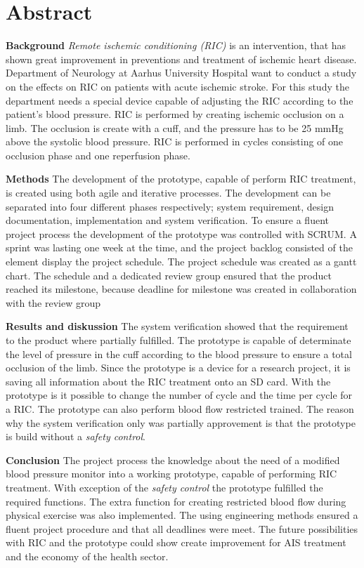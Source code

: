 \chapter*{Abstract}
\textbf{Background} \textit{Remote ischemic conditioning (RIC)} is an intervention, that has shown great improvement in preventions and treatment of ischemic heart disease. Department of Neurology at Aarhus University Hospital want to conduct a study on the effects on RIC on patients with acute ischemic stroke. For this study the department needs a special device capable of adjusting the RIC according to the patient's blood pressure. RIC is performed by creating ischemic occlusion on a limb. The occlusion is create with a cuff, and the pressure has to be 25 mmHg above the systolic blood pressure. RIC is performed in cycles consisting of one occlusion phase and one reperfusion phase. 

\textbf{Methods} The development of the prototype, capable of perform RIC treatment, is created using both agile and iterative processes. The development can be separated into four different phases respectively; system requirement, design documentation, implementation and system verification. To ensure a fluent project process the development of the prototype was controlled with SCRUM. A sprint was lasting one week at the time, and the project backlog consisted of the element display the project schedule. The project schedule was created as a gantt chart. The schedule and a dedicated review group ensured that the product reached its milestone, because deadline for milestone was created in collaboration with the review group 

\textbf{Results and diskussion} The system verification showed that the requirement to the product where partially fulfilled. The prototype is capable of determinate the level of pressure in the cuff according to the blood pressure to ensure a total occlusion of the limb. Since the prototype is a device for a research project, it is saving all information about the RIC treatment onto an SD card. With the prototype is it possible to change the number of cycle and the time per cycle for a RIC. The prototype can also perform blood flow restricted trained. The reason why the system verification only was partially approvement is that the prototype is build without a \textit{safety control}. 

\textbf{Conclusion}
The project process the knowledge about the need of a modified blood pressure monitor into a working prototype, capable of performing RIC treatment. With exception of the \textit{safety control} the prototype fulfilled the required functions. The extra function for creating restricted blood flow during physical exercise was also implemented. The using engineering methods ensured a fluent project procedure and that all deadlines were meet. The future possibilities with RIC and the prototype could show create improvement for AIS treatment and the economy of the health sector. 
